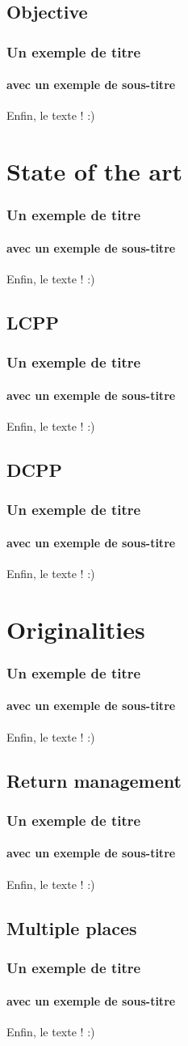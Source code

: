 \documentclass{beamer}
\begin{document}
	\subsection{Objective}
	\begin{frame}
		\frametitle{Un exemple de titre}
		\framesubtitle{avec un exemple de sous-titre}
		Enfin, le texte ! :)
	\end{frame}
	\section{State of the art}
	\begin{frame}
		\frametitle{Un exemple de titre}
		\framesubtitle{avec un exemple de sous-titre}
		Enfin, le texte ! :)
	\end{frame}
	\subsection{LCPP}
	\begin{frame}
		\frametitle{Un exemple de titre}
		\framesubtitle{avec un exemple de sous-titre}
		Enfin, le texte ! :)
	\end{frame}
	\subsection{DCPP}
	\begin{frame}
		\frametitle{Un exemple de titre}
		\framesubtitle{avec un exemple de sous-titre}
		Enfin, le texte ! :)
	\end{frame}
	\section{Originalities}
	\begin{frame}
		\frametitle{Un exemple de titre}
		\framesubtitle{avec un exemple de sous-titre}
		Enfin, le texte ! :)
	\end{frame}
	\subsection{Return management}
	\begin{frame}
		\frametitle{Un exemple de titre}
		\framesubtitle{avec un exemple de sous-titre}
		Enfin, le texte ! :)
	\end{frame}
	\subsection{Multiple places}
	\begin{frame}
		\frametitle{Un exemple de titre}
		\framesubtitle{avec un exemple de sous-titre}
		Enfin, le texte ! :)
	\end{frame}
\end{document}
